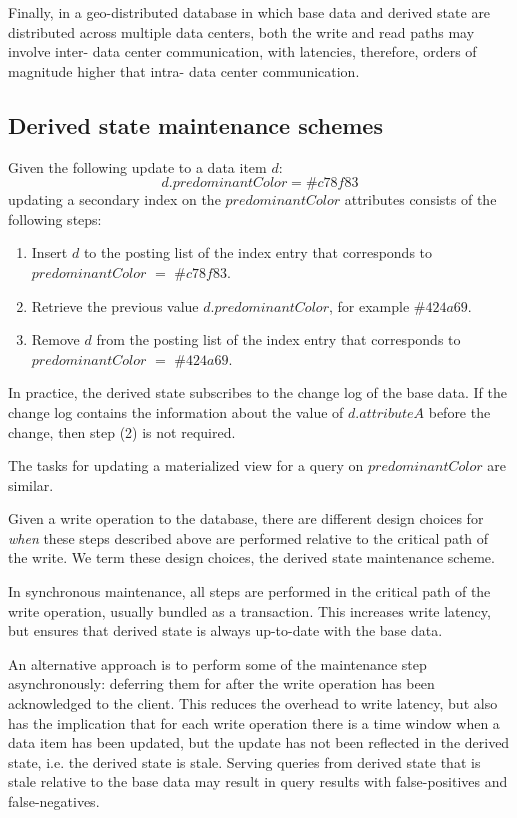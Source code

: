 Finally, in a geo-distributed database in which base data and derived state are distributed across multiple data centers,
both the write and read paths may involve inter- data center communication, with latencies, therefore, orders of magnitude
higher that intra- data center communication.


\subsection{Derived state maintenance schemes}
\label{sec:sync_async_maintenance}


Given the following update to a data item $d$:
\[
d.predominantColor = \#c78f83
\]
updating a secondary index on the $predominantColor$ attributes consists of the following steps:
\begin{enumerate}
  \item Insert $d$ to the posting list of the index entry that corresponds to $predominantColor$ $=$ $\#c78f83$.
  \item Retrieve the previous value $d.predominantColor$, for example $\#424a69$.
  \item Remove $d$ from the posting list of the index entry that corresponds to $predominantColor$ $=$ $\#424a69$.
\end{enumerate}

In practice, the derived state subscribes to the change log of the base data.
If the change log contains the information about the value of $d.attributeA$ before the change, then step (2) is not
required.

The tasks for updating a materialized view for a query on $predominantColor$ are similar.

Given a write operation to the database,
there are different design choices for \textit{when} these steps described above are performed relative to the critical
path of the write.
We term these design choices, the derived state maintenance scheme.

In synchronous maintenance, all steps are performed in the critical path of the write operation,
usually bundled as a transaction.
This increases write latency, but ensures that derived state is always up-to-date with the base data.

An alternative approach is to perform some of the maintenance step asynchronously: deferring them for after the write
operation has been acknowledged to the client.
This reduces the overhead to write latency, but also has the implication that for each write operation
there is a time window when a data item has been updated, but the update has not been reflected in the derived state,
i.e. the derived state is stale.
Serving queries from derived state that is stale relative to the base data may result in query results with false-positives
and false-negatives.

